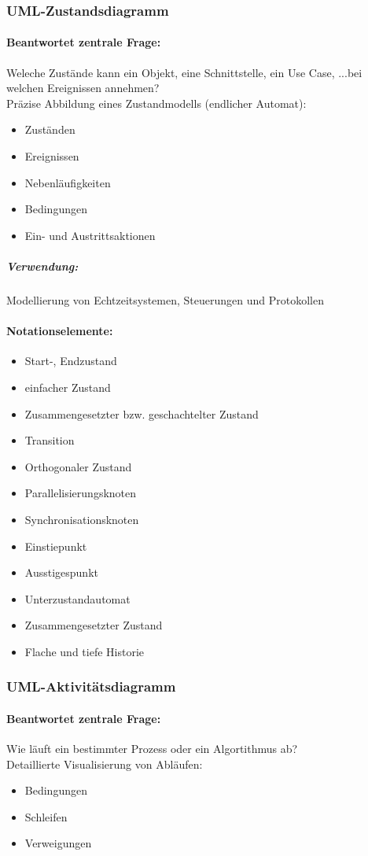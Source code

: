 \documentclass[../ZF_SWEN1.tex]{subfiles}
\begin{document}
\subsubsection{UML-Zustandsdiagramm}
\paragraph{Beantwortet zentrale Frage:\\}
Weleche Zustände kann ein Objekt, eine Schnittstelle, ein Use Case, ...bei welchen Ereignissen annehmen?\\
Präzise Abbildung eines Zustandmodells (endlicher Automat):
\begin{itemize}
	\item Zuständen
	\item Ereignissen
	\item Nebenläufigkeiten
	\item Bedingungen
	\item Ein- und Austrittsaktionen
\end{itemize}
\subparagraph{Verwendung:} Modellierung von Echtzeitsystemen, Steuerungen und Protokollen 

\paragraph{Notationselemente:}
\begin{itemize}
	\item Start-, Endzustand
	\item einfacher Zustand
	\item Zusammengesetzter bzw. geschachtelter Zustand
	\item Transition
	\item Orthogonaler Zustand
	\item Parallelisierungsknoten
	\item Synchronisationsknoten
	\item Einstiepunkt
	\item Ausstigespunkt
	\item Unterzustandautomat
	\item Zusammengesetzter Zustand
	\item Flache und tiefe Historie
\end{itemize}


\subsubsection{UML-Aktivitätsdiagramm}
\paragraph{Beantwortet zentrale Frage:\\}
Wie läuft ein bestimmter Prozess oder ein Algortithmus ab?\\
Detaillierte Visualisierung von Abläufen:
\begin{itemize}
	\item Bedingungen
	\item Schleifen
	\item Verweigungen
\end{itemize}
\end{document}
